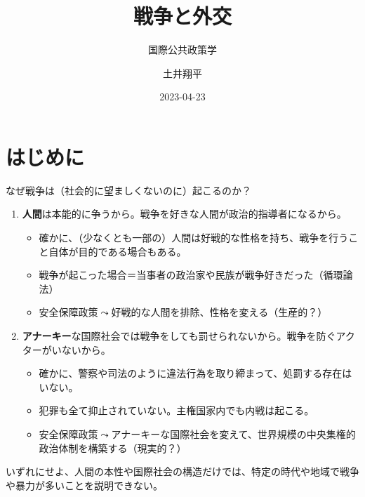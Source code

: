 \documentclass[
  xelatex,
  ja=standard]{bxjsarticle}
\title{戦争と外交}
\subtitle{国際公共政策学}
\author{土井翔平}
\date{2023-04-23}
\providecommand{\tightlist}{%
  \setlength{\itemsep}{0pt}\setlength{\parskip}{0pt}}\usepackage{longtable,booktabs,array}
\begin{document}
\maketitle
\ifdefined\Shaded\renewenvironment{Shaded}{\begin{tcolorbox}[borderline west={3pt}{0pt}{shadecolor}, boxrule=0pt, interior hidden, sharp corners, frame hidden, breakable, enhanced]}{\end{tcolorbox}}\fi

\hypertarget{ux306fux3058ux3081ux306b}{%
\section*{はじめに}\label{ux306fux3058ux3081ux306b}}

なぜ戦争は（社会的に望ましくないのに）起こるのか？

\begin{enumerate}
\def\labelenumi{\arabic{enumi}.}
\tightlist
\item
  \textbf{⼈間}は本能的に争うから。戦争を好きな⼈間が政治的指導者になるから。

  \begin{itemize}
  \tightlist
  \item
    確かに、（少なくとも一部の）人間は好戦的な性格を持ち、戦争を行うこと自体が目的である場合もある。
  \item
    戦争が起こった場合＝当事者の政治家や⺠族が戦争好きだった（循環論法）
  \item
    安全保障政策\(\leadsto\)好戦的な人間を排除、性格を変える（生産的？）
  \end{itemize}
\item
  \textbf{アナーキー}な国際社会では戦争をしても罰せられないから。戦争を防ぐアクターがいないから。

  \begin{itemize}
  \tightlist
  \item
    確かに、警察や司法のように違法行為を取り締まって、処罰する存在はいない。
  \item
    犯罪も全て抑止されていない。主権国家内でも内戦は起こる。
  \item
    安全保障政策\(\leadsto\)アナーキーな国際社会を変えて、世界規模の中央集権的政治体制を構築する（現実的？）
  \end{itemize}
\end{enumerate}

いずれにせよ、人間の本性や国際社会の構造だけでは、特定の時代や地域で戦争や暴力が多いことを説明できない。
\end{document}
